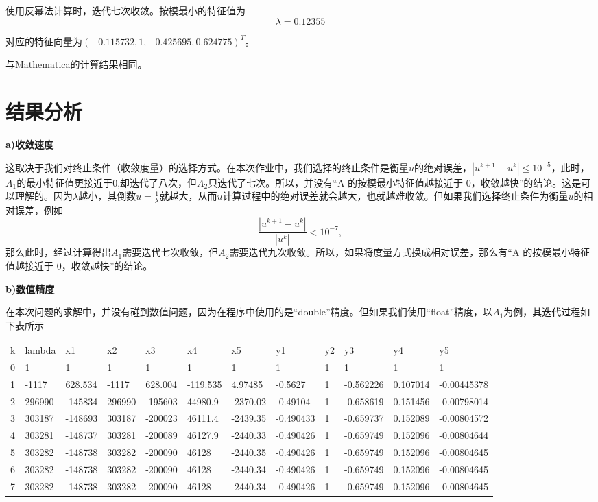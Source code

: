 \documentclass[english]{ctexart}
\providecommand{\tabularnewline}{\\}
\begin{document}
使用反幂法计算时，迭代七次收敛。按模最小的特征值为
\begin{equation}
\lambda=0.12355
\end{equation}

对应的特征向量为$(-0.115732,1,-0.425695,0.624775)^{T}$。

与Mathematica的计算结果相同。

\section{结果分析}

\textbf{a)收敛速度}

这取决于我们对终止条件（收敛度量）的选择方式。在本次作业中，我们选择的终止条件是衡量$u$的绝对误差，$|u^{k+1}-u^{k}|\leq10^{-5}$，此时，$A_{1}$的最小特征值更接近于$0$,却迭代了八次，但$A_{2}$只迭代了七次。所以，并没有“A
的按模最小特征值越接近于 0，收敛越快”的结论。这是可以理解的。因为$\lambda$越小，其倒数$u=\frac{1}{\lambda}$就越大，从而$u$计算过程中的绝对误差就会越大，也就越难收敛。但如果我们选择终止条件为衡量$u$的相对误差，例如
\begin{equation}
\frac{|u^{k+1}-u^{k}|}{|u^{k}|}<10^{-7},
\end{equation}
那么此时，经过计算得出$A_{1}$需要迭代七次收敛，但$A_{2}$需要迭代九次收敛。所以，如果将度量方式换成相对误差，那么有“A
的按模最小特征值越接近于 0，收敛越快”的结论。

\textbf{b)数值精度}

在本次问题的求解中，并没有碰到数值问题，因为在程序中使用的是“double”精度。但如果我们使用“float”精度，以$A_{1}$为例，其迭代过程如下表所示

\begin{tabular}{llllllllllll}
k & lambda & x1 & x2 & x3 & x4 & x5 & y1 & y2 & y3 & y4 & y5\tabularnewline
0 & 1 & 1 & 1 & 1 & 1 & 1 & 1 & 1 & 1 & 1 & 1\tabularnewline
1 & -1117 & 628.534 & -1117 & 628.004 & -119.535 & 4.97485 & -0.5627 & 1 & -0.562226 & 0.107014 & -0.00445378\tabularnewline
2 & 296990 & -145834 & 296990 & -195603 & 44980.9 & -2370.02 & -0.49104 & 1 & -0.658619 & 0.151456 & -0.00798014\tabularnewline
3 & 303187 & -148693 & 303187 & -200023 & 46111.4 & -2439.35 & -0.490433 & 1 & -0.659737 & 0.152089 & -0.00804572\tabularnewline
4 & 303281 & -148737 & 303281 & -200089 & 46127.9 & -2440.33 & -0.490426 & 1 & -0.659749 & 0.152096 & -0.00804644\tabularnewline
5 & 303282 & -148738 & 303282 & -200090 & 46128 & -2440.35 & -0.490426 & 1 & -0.659749 & 0.152096 & -0.00804645\tabularnewline
6 & 303282 & -148738 & 303282 & -200090 & 46128 & -2440.34 & -0.490426 & 1 & -0.659749 & 0.152096 & -0.00804645\tabularnewline
7 & 303282 & -148738 & 303282 & -200090 & 46128 & -2440.34 & -0.490426 & 1 & -0.659749 & 0.152096 & -0.00804645\tabularnewline
\end{tabular}
\end{document}
